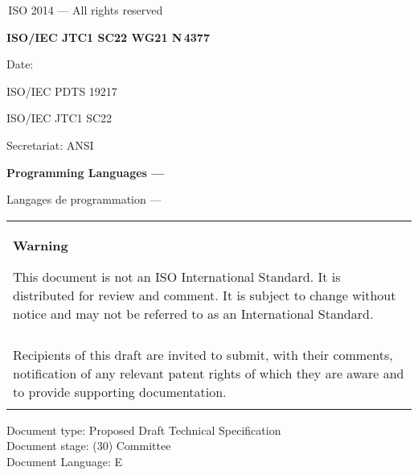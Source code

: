

\thispagestyle{empty}
{\raisebox{.35ex}{\smaller\copyright}}\,ISO 2014 --- All rights reserved
\vspace{2ex}

\begin{flushright}
\textbf{ISO/IEC JTC1 SC22 WG21 N\,\LARGE4377}

Date: \reldate

ISO/IEC PDTS 19217

ISO/IEC JTC1 SC22

Secretariat: ANSI

\end{flushright}

\vfill

\textbf{\LARGE Programming Languages --- \doctitle}

Langages de programmation --- \frtitle

\vfill

\begin{tabular}{|p{\hsize}|}
\hline
\begin{center}
\textbf{Warning}
\end{center}

\vspace{2ex}

This document is not an ISO International Standard. It is distributed
for review and comment. It is subject to change without notice and may
not be referred to as an International Standard.\\\\

Recipients of this draft are invited to submit, with their comments,
notification of any relevant patent rights of which they are aware
and to provide supporting documentation.\\\\
\hline
\end{tabular}

\vfill
\noindent
Document type: Proposed Draft Technical Specification\\
Document stage: (30) Committee\\
Document Language: E
\pagebreak

\thispagestyle{cpppage}

